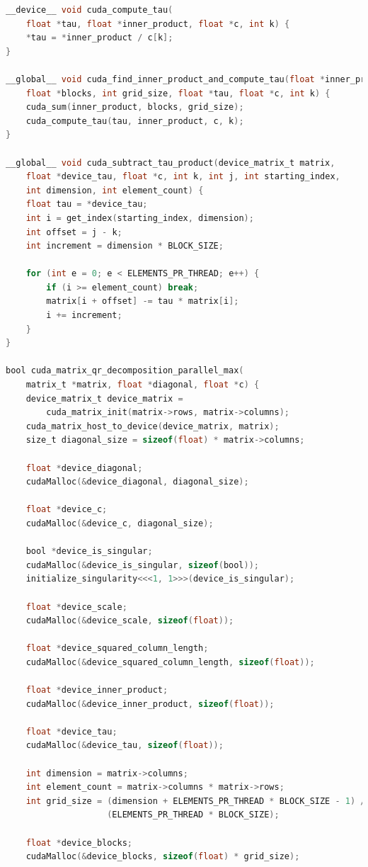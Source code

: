 \begin{lstlisting}[language=C, caption={QR Decomposition GPU Parallel Max Implementation}, label={lst:qr_gpu_parallel_max}]
__device__ void cuda_compute_tau(
    float *tau, float *inner_product, float *c, int k) {
    *tau = *inner_product / c[k];
}

__global__ void cuda_find_inner_product_and_compute_tau(float *inner_product,
    float *blocks, int grid_size, float *tau, float *c, int k) {
    cuda_sum(inner_product, blocks, grid_size);
    cuda_compute_tau(tau, inner_product, c, k);
}

__global__ void cuda_subtract_tau_product(device_matrix_t matrix,
    float *device_tau, float *c, int k, int j, int starting_index,
    int dimension, int element_count) {
    float tau = *device_tau;
    int i = get_index(starting_index, dimension);
    int offset = j - k;
    int increment = dimension * BLOCK_SIZE;

    for (int e = 0; e < ELEMENTS_PR_THREAD; e++) {
        if (i >= element_count) break;
        matrix[i + offset] -= tau * matrix[i];
        i += increment;
    }
}

bool cuda_matrix_qr_decomposition_parallel_max(
    matrix_t *matrix, float *diagonal, float *c) {
    device_matrix_t device_matrix =
        cuda_matrix_init(matrix->rows, matrix->columns);
    cuda_matrix_host_to_device(device_matrix, matrix);
    size_t diagonal_size = sizeof(float) * matrix->columns;

    float *device_diagonal;
    cudaMalloc(&device_diagonal, diagonal_size);

    float *device_c;
    cudaMalloc(&device_c, diagonal_size);

    bool *device_is_singular;
    cudaMalloc(&device_is_singular, sizeof(bool));
    initialize_singularity<<<1, 1>>>(device_is_singular);

    float *device_scale;
    cudaMalloc(&device_scale, sizeof(float));

    float *device_squared_column_length;
    cudaMalloc(&device_squared_column_length, sizeof(float));

    float *device_inner_product;
    cudaMalloc(&device_inner_product, sizeof(float));

    float *device_tau;
    cudaMalloc(&device_tau, sizeof(float));

    int dimension = matrix->columns;
    int element_count = matrix->columns * matrix->rows;
    int grid_size = (dimension + ELEMENTS_PR_THREAD * BLOCK_SIZE - 1) /
                    (ELEMENTS_PR_THREAD * BLOCK_SIZE);

    float *device_blocks;
    cudaMalloc(&device_blocks, sizeof(float) * grid_size);


\end{lstlisting}
